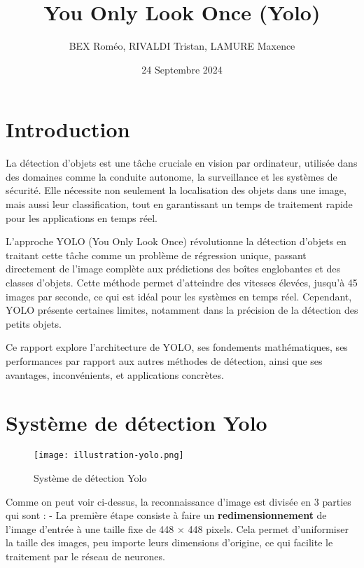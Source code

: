 \documentclass[a4paper,12pt]{article}
\title{You Only Look Once (Yolo)}
\author{BEX Roméo, RIVALDI Tristan, LAMURE Maxence}
\date{24 Septembre 2024}
\begin{document}
\maketitle

\tableofcontents

\newpage

\section{Introduction}

La détection d'objets est une tâche cruciale en vision par ordinateur, utilisée dans des domaines comme la conduite autonome, la surveillance et les systèmes de sécurité. Elle nécessite non seulement la localisation des objets dans une image, mais aussi leur classification, tout en garantissant un temps de traitement rapide pour les applications en temps réel.

L'approche YOLO (You Only Look Once) révolutionne la détection d'objets en traitant cette tâche comme un problème de régression unique, passant directement de l'image complète aux prédictions des boîtes englobantes et des classes d'objets. Cette méthode permet d'atteindre des vitesses élevées, jusqu'à 45 images par seconde, ce qui est idéal pour les systèmes en temps réel. Cependant, YOLO présente certaines limites, notamment dans la précision de la détection des petits objets.

Ce rapport explore l'architecture de YOLO, ses fondements mathématiques, ses performances par rapport aux autres méthodes de détection, ainsi que ses avantages, inconvénients, et applications concrètes.

\section{Système de détection Yolo}

\begin{figure}[H]
    \centering
    \texttt{[image: illustration-yolo.png]}
    \caption{Système de détection Yolo}
    \label{fig:enter-label}
\end{figure}

Comme on peut voir ci-dessus, la reconnaissance d'image est divisée en 3 parties qui sont :    
- La première étape consiste à faire un \textbf{redimensionnement} de l'image d'entrée à une taille fixe de 448 × 448 pixels. Cela permet d'uniformiser la taille des images, peu importe leurs dimensions d'origine, ce qui facilite le traitement par le réseau de neurones.
\end{document}
